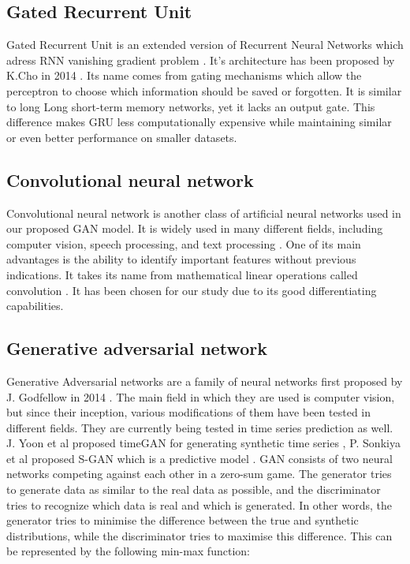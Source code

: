 \documentclass[11pt]{article} %
\begin{document}
\subsection{Gated Recurrent Unit}
Gated Recurrent Unit is an extended version of Recurrent Neural Networks which adress RNN vanishing gradient problem \cite{gru2}.
It's architecture has been proposed by K.Cho in 2014 \cite{gru3}. Its name comes from gating mechanisms which allow the perceptron to choose which information should be saved or forgotten. It is similar to long Long short-term memory networks, yet it lacks an output gate. This difference makes GRU less computationally expensive while maintaining similar or even better performance on smaller datasets. 

\subsection{Convolutional neural network}
Convolutional neural network is another class of artificial neural networks used in our proposed GAN model. It is widely used in many different fields, including computer vision, speech processing, and text processing \cite{cnn1}. One of its main advantages is the ability to identify important features without previous indications. It takes its name from mathematical linear operations called convolution \cite{cnn2}. It has been chosen for our study due to its good differentiating capabilities.

\subsection{Generative adversarial network}
Generative Adversarial networks are a family of neural networks first proposed by J. Godfellow in 2014 \cite{gan1}. The main field in which they are used is computer vision, but since their inception, various modifications of them have been tested in different fields. They are currently being tested in time series prediction as well. J. Yoon et al proposed timeGAN for generating synthetic time series  \cite{time-gan},  P. Sonkiya et al proposed S-GAN which is a predictive model \cite{s-gan}. GAN consists of two neural networks competing against each other in a zero-sum game. The generator tries to generate data as similar to the real data as possible, and the discriminator tries to recognize which data is real and which is generated. In other words, the generator tries to minimise the difference between the true and synthetic distributions, while the discriminator tries to maximise this difference. This can be represented by the following min-max function: 
\end{document}
